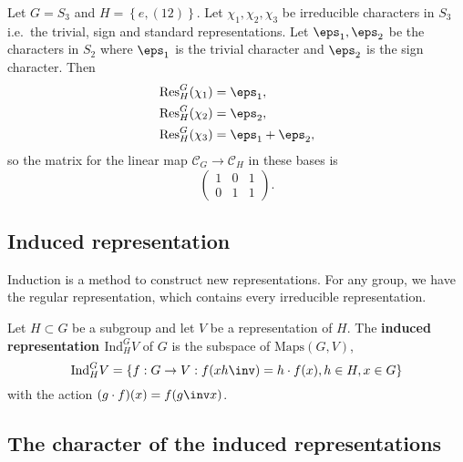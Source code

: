 \documentclass[12pt, a4paper]{article}
\begin{document}
\begin{mdremark}
    
\end{mdremark}

\begin{mdexample}
    Let \(G =S_3\) and \(H = \left\{ e,(12) \right\}\). Let \(\chi_1,\chi_2,\chi_3\) be irreducible characters in \(S_3\) i.e.\ the trivial, sign and standard representations. Let \(\eps_1,\eps_2\) be the characters in \(S_2\) where \(\eps_1\) is the trivial character and \(\eps_2\) is the sign character. Then 
    \[\begin{aligned}
        \text{Res}_H^G(\chi_1)&=\eps_1, \\
        \text{Res}_H^G(\chi_2)&=\eps_2, \\
        \text{Res}_H^G(\chi_3)&=\eps_1+\eps_2,
    \end{aligned}\]
    so the matrix for the linear map \(\mathcal{C}_G \to \mathcal{C}_H\) in these bases is 
    \[\begin{pmatrix}
        1&0&1 \\
        0&1&1
    \end{pmatrix}.\]
\end{mdexample}

\subsection{Induced representation}

\begin{mdnote}
    Induction is a method to construct new representations. For any group, we have the regular representation, which contains every irreducible representation.
\end{mdnote}

\begin{definition}
    Let \(H \subset G\) be a subgroup and let \(V\) be a representation of \(H\). The \textbf{induced representation \(\text{Ind}_H^G V\)} of \(G\)  is the subspace of \(\text{Maps}(G,V)\),
    \[\text{Ind}_H^G V = \left\{ f : G \to V : f(xh\inv) = h\cdot f(x), h\in H, x\in G \right\}\]
    with the action \((g\cdot f)(x)=f(g\inv x)\).
\end{definition}


\subsection{The character of the induced representations}
\end{document}
